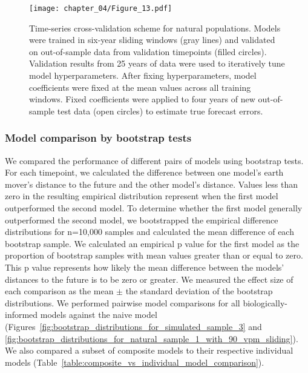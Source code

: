 \begin{figure}
  \begin{center}
  \texttt{[image: chapter\_04/Figure\_13.pdf]}
  \caption{
  Time-series cross-validation scheme for natural populations.
  Models were trained in six-year sliding windows (gray lines) and validated on out-of-sample data from validation timepoints (filled circles).
  Validation results from 25 years of data were used to iteratively tune model hyperparameters.
  After fixing hyperparameters, model coefficients were fixed at the mean values across all training windows.
  Fixed coefficients were applied to four years of new out-of-sample test data (open circles) to estimate true forecast errors.
  }
  \label{fig:cross_validation_for_natural_populations}
  \end{center}
\end{figure}

\subsubsection*{Model comparison by bootstrap tests}

We compared the performance of different pairs of models using bootstrap tests.
For each timepoint, we calculated the difference between one model's earth mover's distance to the future and the other model's distance.
Values less than zero in the resulting empirical distribution represent when the first model outperformed the second model.
To determine whether the first model generally outperformed the second model, we bootstrapped the empirical difference distributions for n=10,000 samples and calculated the mean difference of each bootstrap sample.
We calculated an empirical p value for the first model as the proportion of bootstrap samples with mean values greater than or equal to zero.
This p value represents how likely the mean difference between the models' distances to the future is to be zero or greater.
We measured the effect size of each comparison as the mean $\pm$ the standard deviation of the bootstrap distributions.
We performed pairwise model comparisons for all biologically-informed models against the naive model (Figures~\ref{fig:bootstrap_distributions_for_simulated_sample_3} and \ref{fig:bootstrap_distributions_for_natural_sample_1_with_90_vpm_sliding}).
We also compared a subset of composite models to their respective individual models (Table~\ref{table:composite_vs_individual_model_comparison}).

